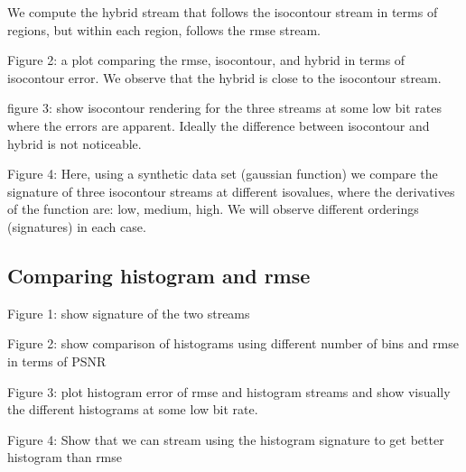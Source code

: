 We compute the hybrid stream that follows the isocontour stream in terms of regions, but within each region, follows the rmse stream.

Figure 2: a plot comparing the rmse, isocontour, and hybrid in terms of isocontour error. We observe that the hybrid is close to the isocontour stream.

figure 3: show isocontour rendering for the three streams at some low bit rates where the errors are apparent. Ideally the difference between isocontour and hybrid is not noticeable.


Figure 4:
Here, using a synthetic data set (gaussian function) we compare the signature of three isocontour streams at different isovalues, where the derivatives of the function are: low, medium, high. We will observe different orderings (signatures) in each case.

\subsection{Comparing histogram and rmse}
Figure 1: show signature of the two streams

Figure 2: show comparison of histograms using different number of bins and rmse in terms of PSNR

Figure 3: plot histogram error of rmse and histogram streams and show visually the different histograms at some low bit rate.

Figure 4: Show that we can stream using the histogram signature to get better histogram than rmse